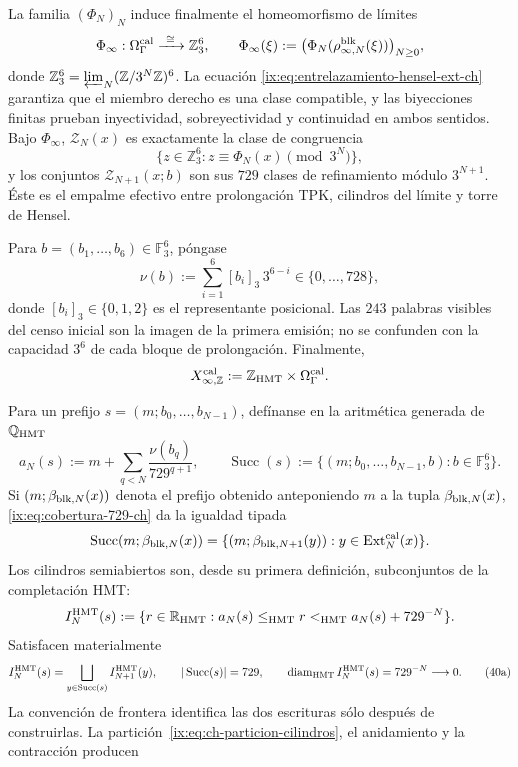 La familia \((\Phi_N)_N\) induce finalmente el homeomorfismo de límites
\begin{equation}
 \Phi_\infty:\Omega_\Gamma^{\rm cal}
 \xrightarrow{\ \cong\ }\mathbb Z_3^6,\qquad
 \Phi_\infty(\xi):=
 \bigl(\Phi_N(\rho^{\rm blk}_{\infty,N}(\xi))\bigr)_{N\ge0},
 \label{ix:eq:phi-infinito-hensel-ext-ch}
\end{equation}
donde
\(\mathbb Z_3^6=\varprojlim_N(\mathbb Z/3^N\mathbb Z)^6\).
La ecuación \eqref{ix:eq:entrelazamiento-hensel-ext-ch} garantiza que el miembro
derecho es una clase compatible, y las biyecciones finitas prueban
inyectividad, sobreyectividad y continuidad en ambos sentidos. Bajo
\(\Phi_\infty\), \(\mathscr Z_N(x)\) es exactamente la clase de congruencia
\[
 \{z\in\mathbb Z_3^6:z\equiv\Phi_N(x)\pmod{3^N}\},
\]
y los conjuntos \(\mathscr Z_{N+1}(x;b)\) son sus \(729\) clases de refinamiento
módulo \(3^{N+1}\). Éste es el empalme efectivo entre prolongación TPK,
cilindros del límite y torre de Hensel.

Para \(b=(b_1,\ldots,b_6)\in\mathbb F_3^6\), póngase
\[
 \nu(b):=\sum_{i=1}^{6}[b_i]_3\,3^{6-i}
 \in\{0,\ldots,728\},
\tag{40c$_0$}
\label{ix:eq:valor-bloque-ch}
\]
donde \([b_i]_3\in\{0,1,2\}\) es el representante posicional. Las
\(243\) palabras visibles del censo inicial son la imagen de la primera
emisión; no se confunden con la capacidad \(3^6\) de cada bloque de
prolongación. Finalmente,
\[
 X_{\infty,\mathbb Z}^{\rm cal}
 :=\mathbb Z_{\rm HMT}\times\Omega_\Gamma^{\rm cal}.
\]



Para un prefijo \(s=(m;b_0,\ldots,b_{N-1})\), defínanse en la aritmética
generada de \(\mathbb Q_{\rm HMT}\)
\[
 a_N(s):=m+\sum_{q<N}\frac{\nu(b_q)}{729^{q+1}},
 \qquad
 \operatorname{Succ}(s):=
 \{(m;b_0,\ldots,b_{N-1},b):b\in\mathbb F_3^6\}.
\]
Si \((m;\beta_{{\rm blk},N}(x))\) denota el prefijo obtenido anteponiendo
\(m\) a la tupla \(\beta_{{\rm blk},N}(x)\),
\eqref{ix:eq:cobertura-729-ch} da la igualdad tipada
\[
 \operatorname{Succ}(m;\beta_{{\rm blk},N}(x))
 =\{(m;\beta_{{\rm blk},N+1}(y)):
       y\in\operatorname{Ext}^{\rm cal}_N(x)\}.
\]
Los cilindros semiabiertos son, desde su primera definición, subconjuntos de
la completación HMT:
\[
 I_N^{\rm HMT}(s):=
 \{r\in\mathbb R_{\rm HMT}:
      a_N(s)\le_{\rm HMT}r<_{\rm HMT}a_N(s)+729^{-N}\}.
\]
Satisfacen materialmente
\[
 I_N^{\rm HMT}(s)=
 \bigsqcup_{y\in\operatorname{Succ}(s)}I_{N+1}^{\rm HMT}(y),
 \qquad |\operatorname{Succ}(s)|=729,
 \qquad \operatorname{diam}_{\rm HMT}I_N^{\rm HMT}(s)
      =729^{-N}\longrightarrow0.
\tag{40a}\label{ix:eq:ch-particion-cilindros}
\]
La convención de frontera identifica las dos escrituras sólo después de
construirlas. La partición~\eqref{ix:eq:ch-particion-cilindros}, el anidamiento y la contracción producen

